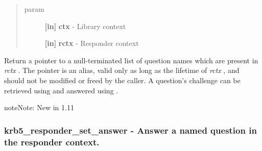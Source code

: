 \documentclass[letterpaper,10pt,english]{sphinxmanual}
\begin{document}
\begin{fulllineitems}
\label{appdev/refs/api/krb5_responder_list_questions:c.krb5_responder_list_questions}
\end{fulllineitems}

\begin{quote}\begin{description}
\item[{param}] \leavevmode
\textbf{{[}in{]}} \textbf{ctx} - Library context

\textbf{{[}in{]}} \textbf{rctx} - Responder context

\end{description}\end{quote}

Return a pointer to a null-terminated list of question names which are present in \emph{rctx} . The pointer is an alias, valid only as long as the lifetime of \emph{rctx} , and should not be modified or freed by the caller. A question's challenge can be retrieved using {\hyperref[appdev/refs/api/krb5_responder_get_challenge:c.krb5_responder_get_challenge]{}} and answered using {\hyperref[appdev/refs/api/krb5_responder_set_answer:c.krb5_responder_set_answer]{}} .

\begin{notice}{note}{Note:}
New in 1.11
\end{notice}


\subsubsection{krb5\_responder\_set\_answer -  Answer a named question in the responder context.}
\label{appdev/refs/api/krb5_responder_set_answer:krb5-responder-set-answer-answer-a-named-question-in-the-responder-context}\label{appdev/refs/api/krb5_responder_set_answer::doc}

\begin{fulllineitems}
\label{appdev/refs/api/krb5_responder_set_answer:c.krb5_responder_set_answer}
\end{fulllineitems}
\end{document}
